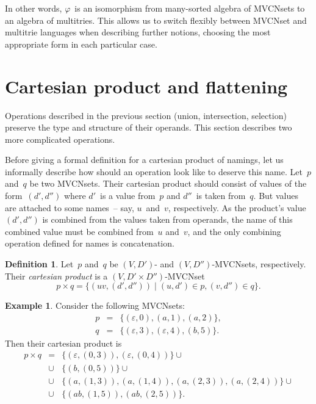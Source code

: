 \documentclass{article}
\theoremstyle{definition}
\newtheorem{Df}{Definition}
\newtheorem{Ex}{Example}
\begin{document}
In other words, $\varphi$~is an isomorphism from many-sorted algebra of
MVCNsets to an algebra of multitries.
This allows us to switch flexibly between MVCNset and multitrie
languages when describing further notions, choosing the most
appropriate form in each particular case.



\section{Cartesian product and flattening}

Operations described in the previous section (union, intersection, selection)
preserve the type and structure of their operands. This section describes two
more complicated operations.

Before giving a formal definition for a cartesian product of namings, let us
informally describe how should an operation look like to deserve this name.
Let~$p$ and~$q$ be two MVCNsets. Their cartesian product should consist of
values of the form~$(d',d'')$ where $d'$~is a value from~$p$ and $d''$~is taken
from~$q$. But values are attached to some names~-- say, $u$~and~$v$,
respectively. As the product's value~$(d',d'')$ is combined from the values
taken from operands, the name of this combined value must be combined from~$u$
and~$v$, and the only combining operation defined for names is concatenation.

\begin{Df}\label{df:mvcn-cartesian}
Let~$p$ and~$q$ be $(V,D')$- and $(V,D'')$-MVCNsets, respectively. Their
\emph{cartesian product} is a $(V,D'\times D'')$-MVCNset
\[
  p\times q = \{ (uv, (d',d'')) \mid (u,d')\in p, (v,d'')\in q \} .
\]
\end{Df}

\begin{Ex}\label{ex:cartesian}
Consider the following MVCNsets:
\begin{eqnarray*}
  p & = & \{ (\varepsilon, 0), (a, 1), (a, 2) \} , \\
  q & = & \{ (\varepsilon, 3), (\varepsilon, 4), (b, 5) \} .
\end{eqnarray*}
Then their cartesian product is
\begin{eqnarray*}
  p \times q & = &  \{ (\varepsilon, (0, 3)), (\varepsilon, (0, 4)) \} \cup \\
    & \cup & \{ (b, (0, 5)) \} \cup \\
    & \cup & \{ (a, (1, 3)), (a, (1, 4)), (a, (2, 3)), (a, (2, 4)) \} \cup \\
    & \cup & \{ (ab, (1, 5)), (ab, (2, 5)) \} .
\end{eqnarray*}
\end{Ex}
\end{document}
